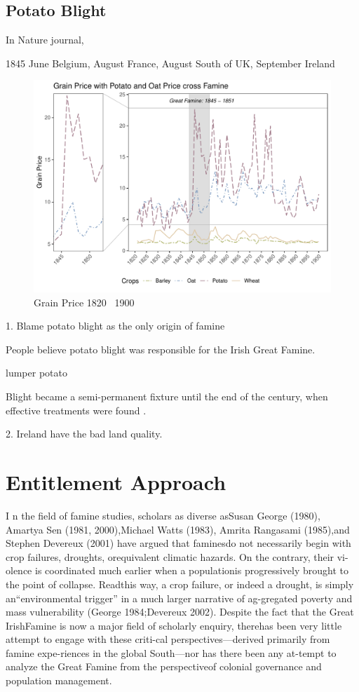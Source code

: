 \subsection{Potato Blight}

In Nature journal,

1845 June Belgium, August France, August South of UK, September Ireland

\begin{figure}[h]
    \centering
    \caption{Grain Price 1820 \textendash\ 1900}
    \includegraphics[width=.95\textwidth]{../03_outputs/grain_price.pdf}
\end{figure}



1. Blame potato blight as the only origin of famine

People believe potato blight was responsible for the Irish Great Famine. 

lumper potato

Blight became a semi-permanent fixture until the end of the century, when effective treatments were found \citep{o1994economic}.

2. Ireland have the bad land quality.

\section{Entitlement Approach}



I n the ﬁeld of famine studies, scholars as diverse asSusan George (1980), Amartya Sen (1981, 2000),Michael Watts (1983), Amrita Rangasami (1985),and Stephen Devereux (2001) have argued that faminesdo not necessarily begin with crop failures, droughts, orequivalent climatic hazards. On the contrary, their vi-olence is coordinated much earlier when a populationis progressively brought to the point of collapse. Readthis way, a crop failure, or indeed a drought, is simply an“environmental trigger” in a much larger narrative of ag-gregated poverty and mass vulnerability (George 1984;Devereux 2002). Despite the fact that the Great IrishFamine is now a major ﬁeld of scholarly enquiry, therehas been very little attempt to engage with these criti-cal perspectives—derived primarily from famine expe-riences in the global South—nor has there been any at-tempt to analyze the Great Famine from the perspectiveof colonial governance and population management. \citep{nally2008coming}


